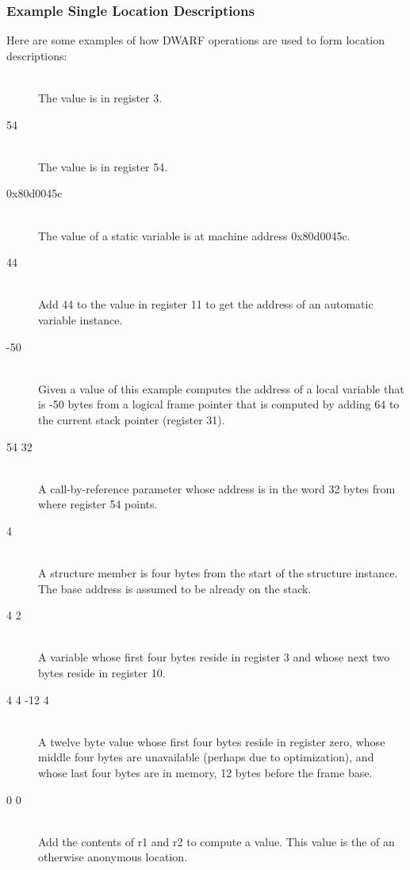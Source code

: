 \subsubsection{Example Single Location Descriptions}

Here are some examples of how DWARF operations are used to form location descriptions:
\newcommand{\descriptionitemnl}[1]{\item[#1]\mbox{}\\}
\begin{description}
\descriptionitemnl{\DWOPregthree}
The value is in register 3.

\descriptionitemnl{\DWOPregx{} 54}
The value is in register 54.

\descriptionitemnl{\DWOPaddr{} 0x80d0045c}
The value of a static variable is at machine address 0x80d0045c.

\descriptionitemnl{\DWOPbregeleven{} 44}
Add 44 to the value in register 11 to get the address of an automatic
variable instance.

\descriptionitemnl{\DWOPfbreg{} -50}
Given a \DWATframebase{} value of
 this example
computes the address of a local variable that is -50 bytes from a
logical frame pointer that is computed by adding 64 to the current
stack pointer (register 31).

\descriptionitemnl{\DWOPbregx{} 54 32 \DWOPderef}
A call-by-reference parameter whose address is in the word 32 bytes
from where register 54 points.

\descriptionitemnl{\DWOPplusuconst{} 4}
A structure member is four bytes from the start of the structure
instance. The base address is assumed to be already on the stack.

\descriptionitemnl{\DWOPregthree{} \DWOPpiece{} 4 \DWOPregten{} \DWOPpiece{} 2}
A variable whose first four bytes reside in register 3 and whose next
two bytes reside in register 10.

\descriptionitemnl{\DWOPregzero{} \DWOPpiece{} 4 \DWOPpiece{} 4 \DWOPfbreg{} -12 \DWOPpiece{} 4}
\vspace{-2\parsep}A twelve byte value whose first four bytes reside in register zero,
whose middle four bytes are unavailable (perhaps due to optimization),
and whose last four bytes are in memory, 12 bytes before the frame
base.

\descriptionitemnl{\DWOPbregone{} 0 \DWOPbregtwo{} 0 \DWOPplus{} \DWOPstackvalue{} }
Add the contents of r1 and r2 to compute a value. This value is the
 of an otherwise anonymous location.


\end{description}
